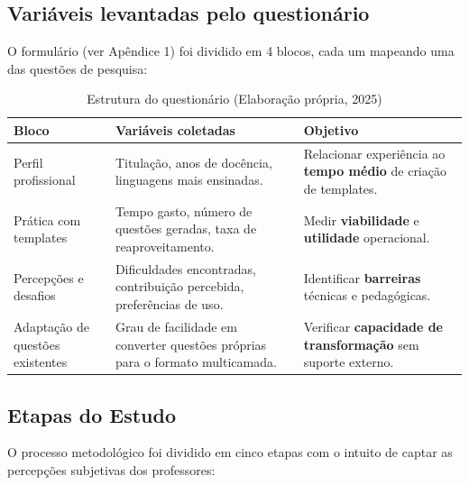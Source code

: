  
\subsection{Variáveis levantadas pelo questionário}
O formulário (ver Apêndice 1) foi dividido em 4 blocos, cada um mapeando uma das questões de pesquisa:

\begin{table}[H]
    \centering
    \begin{tabular}{|p{4cm}|p{5.4cm}|p{6cm}|}
        \hline
        \textbf{Bloco} & \textbf{Variáveis coletadas} & \textbf{Objetivo} \\ \hline
        Perfil profissional & Titulação, anos de docência, linguagens mais ensinadas. & Relacionar experiência ao \textbf{tempo médio} de criação de templates. \\ \hline
        Prática com templates & Tempo gasto, número de questões geradas, taxa de reaproveitamento. & Medir \textbf{viabilidade} e \textbf{utilidade} operacional. \\ \hline
        Percepções e desafios & Dificuldades encontradas, contribuição percebida, preferências de uso. & Identificar \textbf{barreiras} técnicas e pedagógicas. \\ \hline
        Adaptação de questões existentes & Grau de facilidade em converter questões próprias para o formato multicamada. & Verificar \textbf{capacidade de transformação} sem suporte externo. \\ \hline
    \end{tabular}
    \caption{Estrutura do questionário (Elaboração própria, 2025)}
    \label{tab:questionario-objetivos}
\end{table}

\subsection*{Etapas do Estudo}

O processo metodológico foi dividido em cinco etapas com o intuito de captar as percepções subjetivas dos professores:

